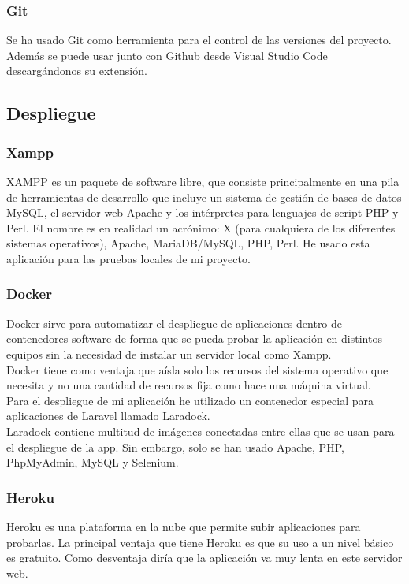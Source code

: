 \subsubsection{Git}
Se ha usado Git como herramienta para el control de las versiones del proyecto. Además se puede usar junto con Github desde Visual Studio Code descargándonos su extensión.

\subsection{Despliegue}

\subsubsection{Xampp}
XAMPP es un paquete de software libre, que consiste principalmente en una pila de herramientas de desarrollo que incluye un sistema de gestión de bases de datos MySQL, el servidor web Apache y los intérpretes para lenguajes de script PHP y Perl. El nombre es en realidad un acrónimo: X (para cualquiera de los diferentes sistemas operativos), Apache, MariaDB/MySQL, PHP, Perl.\cite{Xampp}
He usado esta aplicación para las pruebas locales de mi proyecto.
\subsubsection{Docker}
Docker sirve para automatizar el despliegue de aplicaciones dentro de contenedores software de forma que se pueda probar la aplicación en distintos equipos sin la necesidad de instalar un servidor local como Xampp.\\ \cite{Docker}
Docker tiene como ventaja que aísla solo los recursos del sistema operativo que necesita y no una cantidad de recursos fija como hace una máquina virtual.\\
Para el despliegue de mi aplicación he utilizado un contenedor especial para aplicaciones de Laravel llamado Laradock.\\
Laradock contiene multitud de imágenes conectadas entre ellas que se usan para el despliegue de la app. Sin embargo, solo se han usado Apache, PHP, PhpMyAdmin, MySQL y Selenium.\\
\subsubsection{Heroku}
Heroku es una plataforma en la nube que permite subir aplicaciones para probarlas. La principal ventaja que tiene Heroku es que su uso a un nivel básico es gratuito. Como desventaja diría que la aplicación va muy lenta en este servidor web.

